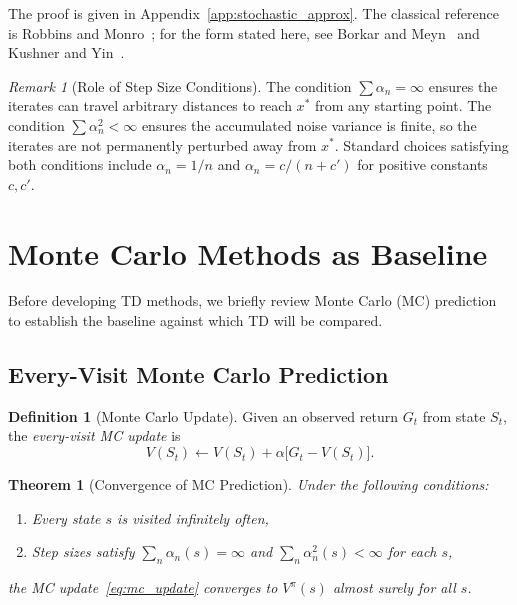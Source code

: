 \documentclass[11pt,a4paper]{article}
\theoremstyle{definition}
\newtheorem{definition}{Definition}[section]
\theoremstyle{plain}
\newtheorem{theorem}{Theorem}[section]
\theoremstyle{remark}
\newtheorem{remark}{Remark}[section]
\begin{document}
The proof is given in Appendix~\ref{app:stochastic_approx}. The classical reference is Robbins and Monro~\cite{robbins1951}; for the form stated here, see Borkar and Meyn~\cite{borkar2000} and Kushner and Yin~\cite{kushner2003}.

\begin{remark}[Role of Step Size Conditions]
\label{rem:step_size}
The condition $\sum \alpha_n = \infty$ ensures the iterates can travel arbitrary distances to reach $x^*$ from any starting point. The condition $\sum \alpha_n^2 < \infty$ ensures the accumulated noise variance is finite, so the iterates are not permanently perturbed away from $x^*$. Standard choices satisfying both conditions include $\alpha_n = 1/n$ and $\alpha_n = c/(n + c')$ for positive constants $c, c'$.
\end{remark}

\section{Monte Carlo Methods as Baseline}
\label{sec:mc}

Before developing TD methods, we briefly review Monte Carlo (MC) prediction to establish the baseline against which TD will be compared.

\subsection{Every-Visit Monte Carlo Prediction}
\label{subsec:mc_prediction}

\begin{definition}[Monte Carlo Update]
\label{def:mc_update}
Given an observed return $G_t$ from state $S_t$, the \emph{every-visit MC update} is
\begin{equation}
    V(S_t) \leftarrow V(S_t) + \alpha\bigl[G_t - V(S_t)\bigr].
    \label{eq:mc_update}
\end{equation}
\end{definition}

\begin{theorem}[Convergence of MC Prediction]
\label{thm:mc_convergence}
Under the following conditions:
\begin{enumerate}[nosep]
    \item Every state $s$ is visited infinitely often,
    \item Step sizes satisfy $\sum_n \alpha_n(s) = \infty$ and $\sum_n \alpha_n^2(s) < \infty$ for each $s$,
\end{enumerate}
the MC update~\eqref{eq:mc_update} converges to $V^\pi(s)$ almost surely for all $s$.
\end{theorem}
\end{document}
